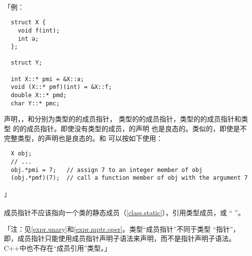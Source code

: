 \paragraph{}
「例：
\begin{lstlisting}
  struct X {
    void f(int);
    int a;
  };

  struct Y;

  int X::* pmi = &X::a;
  void (X::* pmf)(int) = &X::f;
  double X::* pmd;
  char Y::* pmc;
\end{lstlisting}
声明，，和分别为类型的的成员指针，
类型的的成员指针，类型的的成员指针和类型
的的成员指针。即使没有类型的成员，的声明
也是良态的。类似的，即使是不完整类型，的声明也是良态的。和
可以按如下使用：
\begin{lstlisting}
  X obj;
  // ...
  obj.*pmi = 7;   // assign 7 to an integer member of obj
  (obj.*pmf)(7);  // call a function member of obj with the argument 7
\end{lstlisting}」

\paragraph{}
成员指针不应该指向一个类的静态成员（\ref{class.static}），引用类型成员，或
`` ''。 

「注：见\ref{expr.unary}和\ref{expr.mptr.oper}。类型``成员指针''不同于类型
``指针''，即，成员指针只能使用成员指针声明子语法来声明，而不是指针声明子语法。
C++中也不存在``成员引用''类型。」

